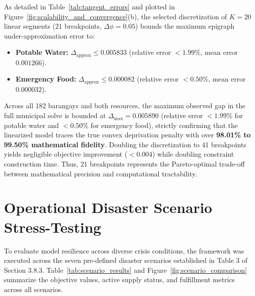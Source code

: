 As detailed in Table~\ref{tab:tangent_errors} and plotted in Figure~\ref{fig:scalability_and_convergence}(b), the selected discretization of $K = 20$ linear segments ($21$ breakpoints, $\Delta \phi = 0.05$) bounds the maximum epigraph under-approximation error to:
\begin{itemize}
    \item \textbf{Potable Water:} $\Delta_{\text{approx}} \le \mathbf{0.005833}$ (relative error $< 1.99\%$, mean error $0.001266$).
    \item \textbf{Emergency Food:} $\Delta_{\text{approx}} \le \mathbf{0.000082}$ (relative error $< 0.50\%$, mean error $0.000032$).
\end{itemize}

Across all 182 barangays and both resources, the maximum observed gap in the full municipal solve is bounded at $\Delta_{\max} = \mathbf{0.005890}$ (relative error $< 1.99\%$ for potable water and $< 0.50\%$ for emergency food), strictly confirming that the linearized model traces the true convex deprivation penalty with over \textbf{98.01\% to 99.50\% mathematical fidelity}. Doubling the discretization to 41 breakpoints yields negligible objective improvement ($< 0.004$) while doubling constraint construction time. Thus, 21 breakpoints represents the Pareto-optimal trade-off between mathematical precision and computational tractability.


\section{Operational Disaster Scenario Stress-Testing}
\label{sec:scenario_testing}

To evaluate model resilience across diverse crisis conditions, the framework was executed across the seven pre-defined disaster scenarios established in Table 3 of Section 3.8.3. Table~\ref{tab:scenario_results} and Figure~\ref{fig:scenario_comparison} summarize the objective values, active supply status, and fulfillment metrics across all scenarios.

